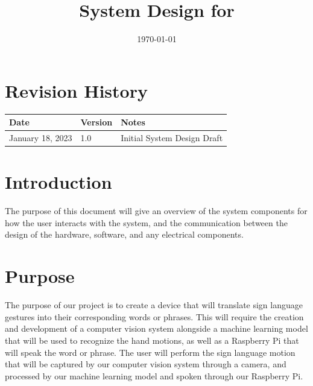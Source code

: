 \documentclass[12pt, titlepage]{article}
\begin{document}
\title{System Design for \progname{}} 
\author{\authname}
\date{\today}

\maketitle


\section{Revision History}

\begin{tabularx}{\textwidth}{p{3cm}p{2cm}X}
\toprule {\bf Date} & {\bf Version} & {\bf Notes}\\
\midrule
January 18, 2023 & 1.0 & Initial System Design Draft\\

\bottomrule
\end{tabularx}

\newpage

\tableofcontents

\newpage

\listoftables

\listoffigures

\newpage


\section{Introduction}
The purpose of this document will give an overview of the system components for how the user interacts with the system, 
and the communication between the design of the hardware, software, and any electrical components.

\section{Purpose}
The purpose of our project is to create a device that will translate sign language gestures into their corresponding words 
or phrases. This will require the creation and development of a computer vision system alongside a machine learning model that 
will be used to recognize the hand motions, as well as a Raspberry Pi that will speak the word or phrase. The user will perform 
the sign language motion that will be captured by our computer vision system through a camera, and processed by our machine learning 
model and spoken through our Raspberry Pi.
\end{document}
